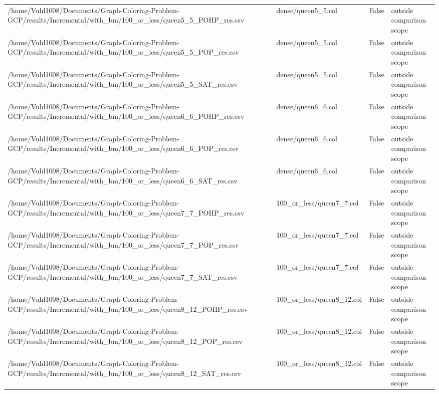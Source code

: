 \begin{table}[htbp]
\begin{tabular}{llll}
/home/Vuhl1008/Documents/Graph-Coloring-Problem-GCP/results/Incremental/with\_bm/100\_or\_less/queen5\_5\_POHP\_res.csv & dense/queen5\_5.col & False & outside comparison scope \\
/home/Vuhl1008/Documents/Graph-Coloring-Problem-GCP/results/Incremental/with\_bm/100\_or\_less/queen5\_5\_POP\_res.csv & dense/queen5\_5.col & False & outside comparison scope \\
/home/Vuhl1008/Documents/Graph-Coloring-Problem-GCP/results/Incremental/with\_bm/100\_or\_less/queen5\_5\_SAT\_res.csv & dense/queen5\_5.col & False & outside comparison scope \\
/home/Vuhl1008/Documents/Graph-Coloring-Problem-GCP/results/Incremental/with\_bm/100\_or\_less/queen6\_6\_POHP\_res.csv & dense/queen6\_6.col & False & outside comparison scope \\
/home/Vuhl1008/Documents/Graph-Coloring-Problem-GCP/results/Incremental/with\_bm/100\_or\_less/queen6\_6\_POP\_res.csv & dense/queen6\_6.col & False & outside comparison scope \\
/home/Vuhl1008/Documents/Graph-Coloring-Problem-GCP/results/Incremental/with\_bm/100\_or\_less/queen6\_6\_SAT\_res.csv & dense/queen6\_6.col & False & outside comparison scope \\
/home/Vuhl1008/Documents/Graph-Coloring-Problem-GCP/results/Incremental/with\_bm/100\_or\_less/queen7\_7\_POHP\_res.csv & 100\_or\_less/queen7\_7.col & False & outside comparison scope \\
/home/Vuhl1008/Documents/Graph-Coloring-Problem-GCP/results/Incremental/with\_bm/100\_or\_less/queen7\_7\_POP\_res.csv & 100\_or\_less/queen7\_7.col & False & outside comparison scope \\
/home/Vuhl1008/Documents/Graph-Coloring-Problem-GCP/results/Incremental/with\_bm/100\_or\_less/queen7\_7\_SAT\_res.csv & 100\_or\_less/queen7\_7.col & False & outside comparison scope \\
/home/Vuhl1008/Documents/Graph-Coloring-Problem-GCP/results/Incremental/with\_bm/100\_or\_less/queen8\_12\_POHP\_res.csv & 100\_or\_less/queen8\_12.col & False & outside comparison scope \\
/home/Vuhl1008/Documents/Graph-Coloring-Problem-GCP/results/Incremental/with\_bm/100\_or\_less/queen8\_12\_POP\_res.csv & 100\_or\_less/queen8\_12.col & False & outside comparison scope \\
/home/Vuhl1008/Documents/Graph-Coloring-Problem-GCP/results/Incremental/with\_bm/100\_or\_less/queen8\_12\_SAT\_res.csv & 100\_or\_less/queen8\_12.col & False & outside comparison scope \\

\end{tabular}
\end{table}
